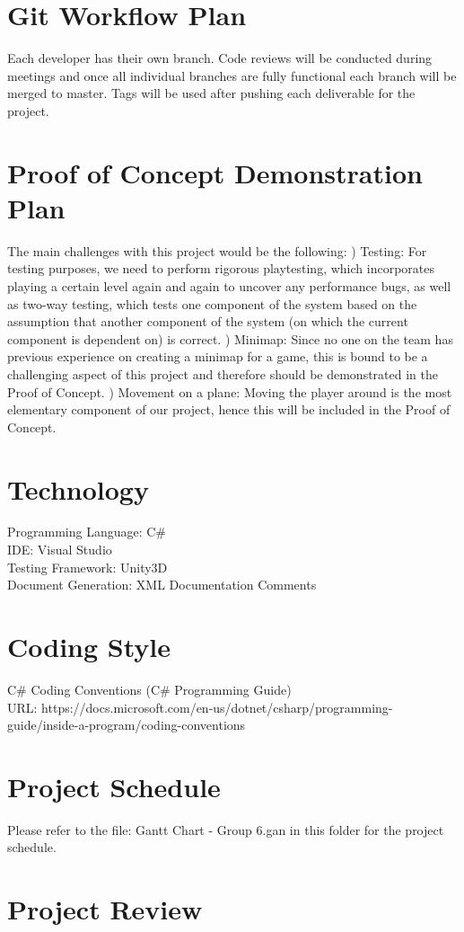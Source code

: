 \documentclass{article}
\begin{document}
\section{Git Workflow Plan}
Each developer has their own branch. Code reviews will be conducted during meetings and once all individual branches are fully functional each branch will be merged to master. Tags will be used after pushing each deliverable for the project.

\section{Proof of Concept Demonstration Plan}
The main challenges with this project would be the following: \newline
{}) Testing: For testing purposes, we need to perform rigorous playtesting, which incorporates playing a certain level again and again to uncover any performance bugs, as well as two-way testing, which tests one component of the system based on the assumption that another component of the system (on which the current component is dependent on) is correct.
\newline
{}) Minimap: Since no one on the team has previous experience on creating a minimap for a game, this is bound to be a challenging aspect of this project and therefore should be demonstrated in the Proof of Concept.
\newline
{}) Movement on a plane: Moving the player around is the most elementary component of our project, hence this will be included in the Proof of Concept.

\section{Technology}
Programming Language: C\# \\
IDE: Visual Studio\\
Testing Framework: Unity3D\\
Document Generation: XML Documentation Comments

\section{Coding Style}
C\# Coding Conventions (C\# Programming Guide)\\
URL: https://docs.microsoft.com/en-us/dotnet/csharp/programming-guide/inside-a-program/coding-conventions

\section{Project Schedule}

Please refer to the file: Gantt Chart - Group 6.gan in this folder for the project schedule.

\section{Project Review}
\end{document}
